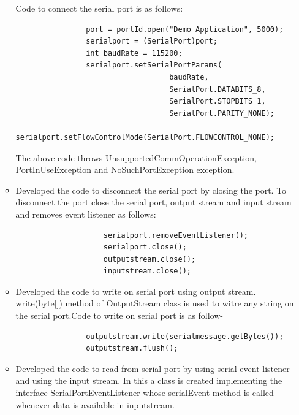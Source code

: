 \documentclass{article}
\begin{document}
\begin{enumerate}
\begin{itemize}
		    Code to connect the serial port is as follows:
		    \newpage
		    \begin{flushleft}
		    	\lstset{language=Java, showspaces=false,
		    		showstringspaces=false, tabsize=1, breaklines=true}
		    	\begin{lstlisting}
		    	port = portId.open("Demo Application", 5000); 
		    	serialport = (SerialPort)port; 
		    	int baudRate = 115200; 
		    	serialport.setSerialPortParams( 
		    	                   baudRate, 
		    	                   SerialPort.DATABITS_8, 
		    	                   SerialPort.STOPBITS_1, 
		    	                   SerialPort.PARITY_NONE); 
		    	serialport.setFlowControlMode(SerialPort.FLOWCONTROL_NONE); 
		    	\end{lstlisting}
		    \end{flushleft}
		    The above code throws UnsupportedCommOperationException, PortInUseException and NoSuchPortException exception.
			\item Developed the code to disconnect the serial port by closing the port. To disconnect the port close the serial port, output stream and input stream and removes event listener as follows: 
			\begin{flushleft}
				\lstset{language=Java, showspaces=false,
					showstringspaces=false, tabsize=1, breaklines=true}
				\begin{lstlisting}
					serialport.removeEventListener(); 
					serialport.close(); 
					outputstream.close(); 
					inputstream.close();
				\end{lstlisting}
			\end{flushleft}
			\item Developed the code to write on serial port using output stream. write(byte[]) method of OutputStream class is used to witre any string on the serial port.Code to write on serial port is as follow- 
			\begin{flushleft}
				\lstset{language=Java, showspaces=false,
					showstringspaces=false, tabsize=1, breaklines=true}
				\begin{lstlisting}
				outputstream.write(serialmessage.getBytes()); 
				outputstream.flush();
				\end{lstlisting}
			\end{flushleft}
			\item Developed the code to read from serial port by using serial event listener and using the input stream. In this a class is created implementing the interface SerialPortEventListener whose serialEvent method is called whenever data is available in inputstream.  

\end{itemize}
\end{enumerate}
\end{document}
